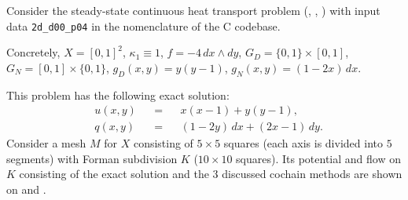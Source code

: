 \begin{example}
  \label{idec/diffusion/continuous/steady_state/examples/2d_d00_p04-example}
  Consider the steady-state continuous heat transport problem
  (,
   ,
   )
  with input data \verb|2d_d00_p04| in the nomenclature of the C codebase.

  Concretely,
    $X = [0, 1]^2$,
    $\kappa_1 \equiv 1$,
    $f = -4 \, d x \wedge d y$,
    $G_D = \{0, 1\} \times [0, 1]$,
    $G_N = [0, 1] \times \{0, 1\}$,
    $g_D(x, y) = y (y - 1)$,
    $g_N(x, y) = (1 - 2 x) \, d x$.

  This problem has the following exact solution:
  \begin{subequations}
    \begin{alignat}{3}
      & u(x, y) && = && x (x - 1) + y (y - 1), \\
      & q(x, y) && = && (1 - 2 y)\, d x + (2 x - 1)\, d y.
    \end{alignat}
  \end{subequations}
  Consider a mesh $M$ for $X$ consisting of $5 \times 5$ squares (each axis is
  divided into $5$ segments) with Forman subdivision $K$
  ($10 \times 10$ squares).
  Its potential and flow on $K$ consisting of the exact solution and the $3$
  discussed cochain methods are shown on
  and
  .
\end{example}
